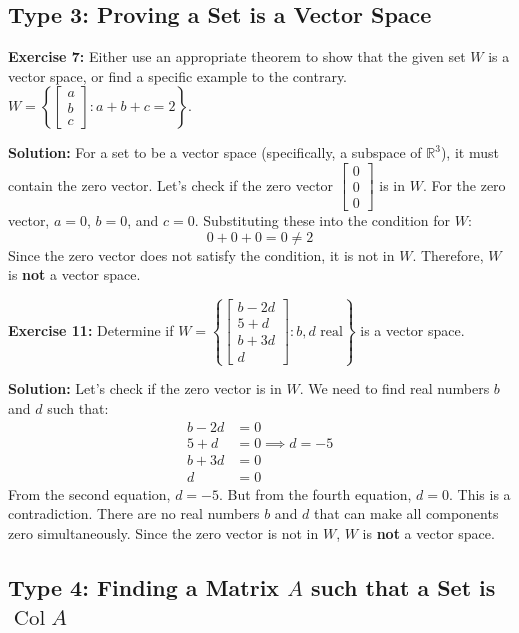 \documentclass[11pt]{article}
\begin{document}
\subsection{Type 3: Proving a Set is a Vector Space}

\textbf{Exercise 7:} Either use an appropriate theorem to show that the given set $W$ is a vector space, or find a specific example to the contrary. $W = \left\{ \begin{bmatrix} a \\ b \\ c \end{bmatrix} : a+b+c=2 \right\}$.

\textbf{Solution:}
For a set to be a vector space (specifically, a subspace of $\mathbb{R}^3$), it must contain the zero vector. 
Let's check if the zero vector $\begin{bmatrix} 0 \\ 0 \\ 0 \end{bmatrix}$ is in $W$. 
For the zero vector, $a=0$, $b=0$, and $c=0$. 
Substituting these into the condition for $W$:
\[
0 + 0 + 0 = 0 \neq 2
\]
Since the zero vector does not satisfy the condition, it is not in $W$. Therefore, $W$ is \textbf{not} a vector space.

\vspace{0.5cm}

\textbf{Exercise 11:} Determine if $W = \left\{ \begin{bmatrix} b-2d \\ 5+d \\ b+3d \\ d \end{bmatrix} : b, d \text{ real} \right\}$ is a vector space.

\textbf{Solution:}
Let's check if the zero vector is in $W$. We need to find real numbers $b$ and $d$ such that:
\begin{align*}
b - 2d &= 0 \\
5 + d &= 0 \implies d = -5 \\
b + 3d &= 0 \\
d &= 0
\end{align*}
From the second equation, $d = -5$. But from the fourth equation, $d = 0$. This is a contradiction. There are no real numbers $b$ and $d$ that can make all components zero simultaneously. Since the zero vector is not in $W$, $W$ is \textbf{not} a vector space.

\subsection{Type 4: Finding a Matrix $A$ such that a Set is $\operatorname{Col} A$}
\end{document}

